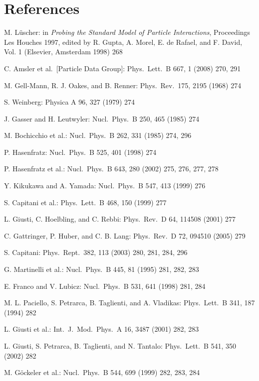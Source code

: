 \section*{References}
\begin{enumerate}[label={[\arabic*]}]
  \item M. L\"uscher: in \emph{Probing the Standard Model of Particle Interactions}, Proceedings Les Houches 1997, edited by R. Gupta, A. Morel, E. de Rafael, and F. David, Vol. 1 (Elsevier, Amsterdam 1998) 268
  \item C. Amsler et al.\ [Particle Data Group]: Phys.\ Lett.\ B 667, 1 (2008) 270, 291
  \item M. Gell-Mann, R. J. Oakes, and B. Renner: Phys.\ Rev.\ 175, 2195 (1968) 274
  \item S. Weinberg: Physica A 96, 327 (1979) 274
  \item J. Gasser and H. Leutwyler: Nucl.\ Phys.\ B 250, 465 (1985) 274
  \item M. Bochicchio et al.: Nucl.\ Phys.\ B 262, 331 (1985) 274, 296
  \item P. Hasenfratz: Nucl.\ Phys.\ B 525, 401 (1998) 274
  \item P. Hasenfratz et al.: Nucl.\ Phys.\ B 643, 280 (2002) 275, 276, 277, 278
  \item Y. Kikukawa and A. Yamada: Nucl.\ Phys.\ B 547, 413 (1999) 276
  \item S. Capitani et al.: Phys.\ Lett.\ B 468, 150 (1999) 277
  \item L. Giusti, C. Hoelbling, and C. Rebbi: Phys.\ Rev.\ D 64, 114508 (2001) 277
  \item C. Gattringer, P. Huber, and C. B. Lang: Phys.\ Rev.\ D 72, 094510 (2005) 279
  \item S. Capitani: Phys.\ Rept.\ 382, 113 (2003) 280, 281, 284, 296
  \item G. Martinelli et al.: Nucl.\ Phys.\ B 445, 81 (1995) 281, 282, 283
  \item E. Franco and V. Lubicz: Nucl.\ Phys.\ B 531, 641 (1998) 281, 284
  \item M. L. Paciello, S. Petrarca, B. Taglienti, and A. Vladikas: Phys.\ Lett.\ B 341, 187 (1994) 282
  \item L. Giusti et al.: Int.\ J.\ Mod.\ Phys.\ A 16, 3487 (2001) 282, 283
  \item L. Giusti, S. Petrarca, B. Taglienti, and N. Tantalo: Phys.\ Lett.\ B 541, 350 (2002) 282
  \item M. G\"ockeler et al.: Nucl.\ Phys.\ B 544, 699 (1999) 282, 283, 284

\end{enumerate}
